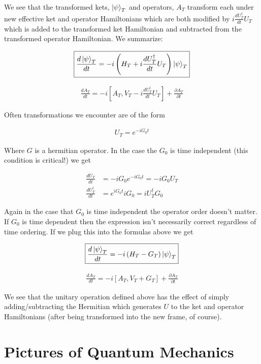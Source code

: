 \documentclass[12pt]{article}
\newcommand{\ddt}[1]{\frac{d #1}{dt}}
\begin{document}
We see that the transformed kets, $\ket{\psi}_T$ and operators, $A_T$ transform each under new effective ket and operator Hamiltonians which are both modified by $i\ddt{U_T^{\dag}}U_T$ which is added to the transformed ket Hamiltonian and subtracted from the transformed operator Hamiltonian. We summarize:

\begin{align}
\boxed{\ddt{\ket{\psi}_T} = -i \left(H_T + i\ddt{U_T^{\dag}}U_T \right) \ket{\psi}_T}
\end{align}

\begin{align}
\boxed{
	\ddt{A_T} = -i\left[A_T, V_T -i\ddt{U_T^{\dag}}U_T \right] + \frac{\partial A_T}{\partial t}
}
\end{align}

Often transformations we encounter are of the form

\begin{align}
U_T = e^{-i G_0 t}
\end{align}

Where $G$ is a hermitian operator. In the case the $G_0$ is time independent (this condition is critical!) we get

\begin{align}
\ddt{U_T} &= -iG_0 e^{-iG_0t} = -iG_0 U_T\\
\ddt{U_T^{\dag}} &= e^{iG_0t} iG_0 = iU_T^{\dag} G_0
\end{align}

Again in the case that $G_0$ is time independent the operator order doesn't matter. If $G_0$ is time dependent then the expression isn't necessarily correct regardless of time ordering. If we plug this into the formulas above we get

\begin{align}
\boxed{\ddt{\ket{\psi}_T} = -i \left(H_T - G_T \right) \ket{\psi}_T}
\end{align}

\begin{align}
\boxed{
	\ddt{A_T} = -i\left[A_T, V_T + G_T \right] + \frac{\partial A_T}{\partial t}
}
\end{align}

We see that the unitary operation defined above has the effect of simply adding/subtracting the Hermitian which generates $U$ to the ket and operator Hamiltonians (after being transformed into the new frame, of course).

\section{Pictures of Quantum Mechanics}
\end{document}
